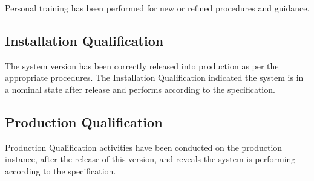 \documentclass[11pt,a4paper,oneside]{article}
\begin{document}
Personal training has been performed for new or refined procedures and guidance.




\subsection{Installation Qualification}
The system version has been correctly released into production as per the appropriate procedures. The Installation Qualification indicated the system is in a nominal state after release and performs according to the specification.





\subsection{Production Qualification}
Production Qualification activities have been conducted on the production instance, after the release of this version, and reveals the system is performing according to the specification.
\end{document}
